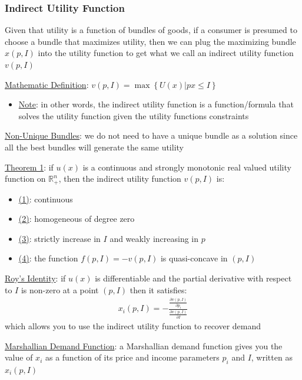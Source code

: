 \documentclass{article}
\begin{document}
\subsubsection{Indirect Utility Function}
Given that utility is a function of bundles of goods, if a consumer is presumed to choose a bundle that maximizes utility, then we can plug the maximizing bundle $x(p,I)$ into the utility function to get what we call an indirect utility function $v(p,I)$ \par \vspace{0.3em}
  \underline{Mathematic Definition}: $v(p,I) = \max \left\{U(x) | px \leq I \right\}$
  \begin{itemize}
    \item  \underline{Note}: in other words, the indirect utility function is a function/formula that solves the utility function given the utility functions constraints
  \end{itemize}
  \par
  \underline{Non-Unique Bundles}: we do not need to have a unique bundle as a solution since all the best bundles will generate the same utility
  \par
  \underline{Theorem 1}: if $u(x)$ is a continuous and strongly monotonic real valued utility function on $\mathbb{R}_{+}^{n}$, then the indirect utility function $v(p, I)$ is:
  \begin{itemize}
    \item  \underline{(1)}: continuous
    \item  \underline{(2)}: homogeneous of degree zero
    \item  \underline{(3)}: strictly increase in $I$ and weakly increasing in $p$
    \item  \underline{(4)}: the function $f(p, I) = -v(p,I)$ is quasi-concave in $(p,I)$
  \end{itemize}
  \par
  \underline{Roy's Identity}: if $u(x)$ is differentiable and the partial derivative with respect to $I$ is non-zero at a point $(p, I)$ then it satisfies:
  \begin{gather*}
    x_{i}(p, I) = -\frac{\tfrac{\partial v(p,I)}{\partial p_{i}}}{\tfrac{\partial v(p,I)}{\partial I}}
  \end{gather*}
  which allows you to use the indirect utility function to recover demand
  \par
  \underline{Marshallian Demand Function}: a Marshallian demand function gives you the value of $x_{i}$ as a function of its price and income parameters $p_{i}$ and $I$, written as $x_{i}(p,I)$
\end{document}
